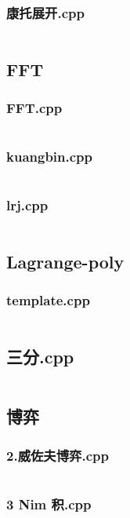\documentclass[a4paper,11pt]{article}
\begin{document}
\subsubsection{康托展开.cpp}
\inputminted[breaklines]{c++}{"D:/tmplz/templates/数学/Combinatorial mathematics/康托展开.cpp"}
\subsection{FFT}
\subsubsection{FFT.cpp}
\inputminted[breaklines]{c++}{"D:/tmplz/templates/数学/FFT/FFT.cpp"}
\subsubsection{kuangbin.cpp}
\inputminted[breaklines]{c++}{"D:/tmplz/templates/数学/FFT/kuangbin.cpp"}
\subsubsection{lrj.cpp}
\inputminted[breaklines]{c++}{"D:/tmplz/templates/数学/FFT/lrj.cpp"}
\subsection{Lagrange-poly}
\subsubsection{template.cpp}
\inputminted[breaklines]{c++}{"D:/tmplz/templates/数学/Lagrange-poly/template.cpp"}
\subsection{三分.cpp}
\inputminted[breaklines]{c++}{"D:/tmplz/templates/数学/三分.cpp"}
\subsection{博弈}
\subsubsection{2.威佐夫博弈.cpp}
\inputminted[breaklines]{c++}{"D:/tmplz/templates/数学/博弈/2.威佐夫博弈.cpp"}
\subsubsection{3 Nim 积.cpp}
\inputminted[breaklines]{c++}{"D:/tmplz/templates/数学/博弈/3 Nim 积.cpp"}
\end{document}
